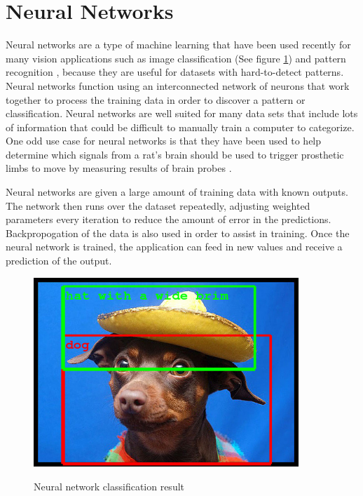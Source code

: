 \documentclass[12pt]{ucthesis}
\newcommand{\captionfonts}{\small\bf\ssp}
\begin{document}
\section{Neural Networks}
Neural networks are a type of machine learning that have been used recently for many vision applications such as image classification (See figure \ref{fig:DogWithHat}) and pattern recognition \cite{christianszegedy2014}, because they are useful for datasets with hard-to-detect patterns. Neural networks function using an interconnected network of neurons that work together to process the training data in order to discover a pattern or classification. Neural networks are well suited for many data sets that include lots of information that could be difficult to manually train a computer to categorize. One odd use case for neural networks is that they have been used to help determine which signals from a rat's brain should be used to trigger prosthetic limbs to move by measuring results of brain probes \cite{ratNeural}.

Neural networks are given a large amount of training data with known outputs. The network then runs over the dataset repeatedly, adjusting weighted parameters every iteration to reduce the amount of error in the predictions. Backpropogation of the data is also used in order to assist in training. Once the neural network is trained, the application can feed in new values and receive a prediction of the output.

\begin{figure}[t]
\begin{center}
\includegraphics[width=10cm]{DogWithHat.PNG}
\captionfonts
\caption[Neural Network Classification Example]{Neural network classification result\cite{christianszegedy2014}}
\label{fig:DogWithHat}
\end{center}
\end{figure}
\end{document}
